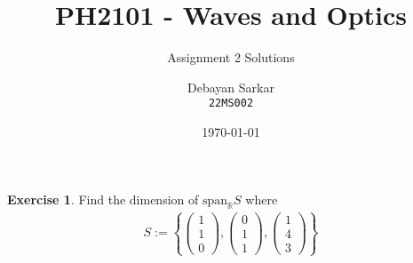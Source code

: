 \documentclass[10pt]{scrartcl}
\title{PH2101 - Waves and Optics}
\subtitle{Assignment 2 Solutions}
\author{Debayan Sarkar \\ \texttt{22MS002}}
\date{\today}
\theoremstyle{definition}
\newtheorem{exercise}{Exercise}
\begin{document}
\maketitle
\begin{exercise}
    Find the dimension of $\text{span}_{\mathbb{R}}S$ where 
    \begin{gather*}
        S := \left\{
        \begin{pmatrix}
            1 \\
            1 \\
            0 
        \end{pmatrix}
        ,
        \begin{pmatrix}
            0 \\
            1 \\
            1 
        \end{pmatrix}
        ,
        \begin{pmatrix}
            1 \\
            4 \\
            3 
        \end{pmatrix}
        \right\}
    \end{gather*}
\end{exercise}
\end{document}
